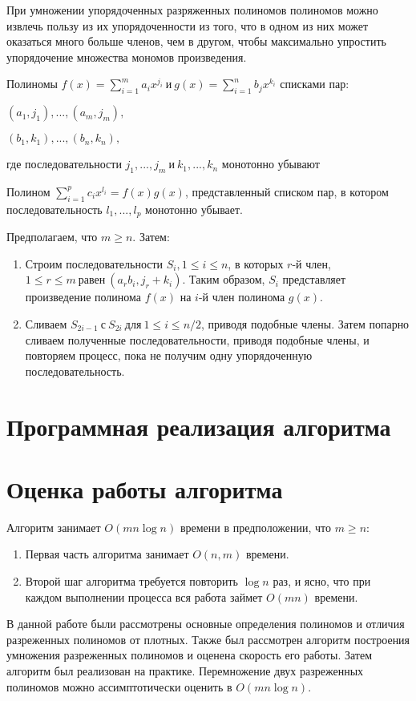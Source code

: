 \documentclass[bachelor, och, labwork]{shiza}
\begin{document}
При умножении упорядоченных разряженных полиномов полиномов можно извлечь пользу
из их упорядоченности из того, что в одном из них может оказаться много больше
членов, чем в другом, чтобы максимально упростить упорядочение множества мономов
произведения.

Полиномы $f(x)=\sum\limits_{i=1}^m{a_ix^{j_i}} ~\text{и}~ g(x)=\sum\limits_{i=1}^n{b_jx^{k_i}}$
списками пар: 
\begin{center} $(a_1,j_1),...,(a_m,j_m),$\end{center}
\begin{center} $(b_1,k_1),...,(b_n,k_n),$\end{center}
где последовательности $j_1,...,j_m ~\text{и}~ k_1,...,k_n$ монотонно убывают

Полином $\sum\limits_{i=1}^p{c_ix^{l_i}} = f(x)g(x)$, представленный списком пар,
в котором последовательность $l_1,...,l_p$ монотонно убывает.

Предполагаем, что $m \ge n$. Затем:
\begin{enumerate}
    
    \item Строим последовательности $S_i,1 \le i \le n$, в которых $r$-й член,
    $1 \le r \le m ~\text{равен}~ (a_rb_i, j_r + k_i)$. Таким образом, $S_i$
    представляет произведение полинома $f(x)$ на $i$-й член полинома $g(x)$.

    \item Сливаем $S_{2i-1} ~\text{с}~ S_{2i} ~\text{для}~ 1\le i \le n/2$,
          приводя подобные члены. Затем попарно сливаем полученные 
          последовательности, приводя подобные члены, и повторяем процесс, пока 
          не получим одну упорядоченную последовательность.

\end{enumerate}

\section{Программная реализация алгоритма}



\section{Оценка работы алгоритма}

Алгоритм занимает $O(mn\log n)$ времени в предположении, что $m \ge n$:
\begin{enumerate}
    \item Первая часть алгоритма занимает $O(n,m)$ времени.
    \item Второй шаг алгоритма требуется повторить $\log n$ раз, и ясно, что при
          каждом выполнении процесса вся работа займет $O(mn)$ времени.
\end{enumerate}

\conclusion

В данной работе были рассмотрены основные определения полиномов и отличия
разреженных полиномов от плотных. Также был рассмотрен алгоритм построения
умножения разреженных полиномов и оценена скорость его работы. Затем алгоритм 
был реализован на практике. Перемножение двух разреженных полиномов можно 
ассимптотически оценить в $O(mn\log n)$.
\end{document}
